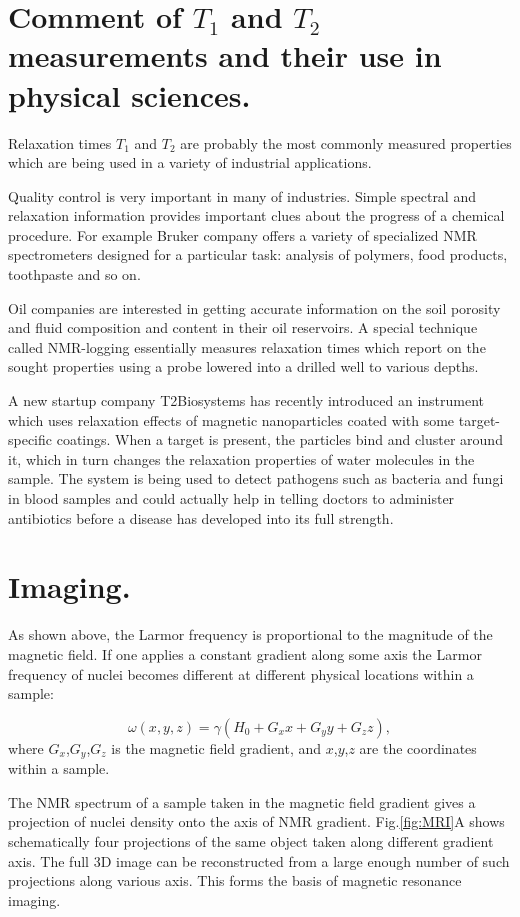\documentclass[a4paper, 12pt]{article}
\begin{document}
\section{Comment of $T_1$ and $T_2$ measurements and their use in physical sciences.}
  Relaxation times  $T_1$ and $T_2$ are probably the most commonly measured properties which are being used in a variety of industrial applications. 
  
  Quality control is very important in many of industries. Simple spectral and relaxation information provides important clues about the progress of a chemical procedure. For example Bruker company offers a variety of specialized NMR spectrometers designed for a particular task: analysis of polymers, food products, toothpaste and so on.
  
  Oil companies are  interested in getting accurate information on the soil porosity and fluid composition and content in their oil reservoirs. A special technique called NMR-logging essentially measures relaxation times which report on the sought properties using a probe lowered into a drilled well to various depths.
  
 A new startup company T2Biosystems has recently introduced an instrument which uses relaxation effects of magnetic nanoparticles coated with some target-specific coatings. When a target is present, the particles bind and cluster around it, which in turn changes the relaxation properties of water molecules in the sample. The system is being used to detect pathogens such as bacteria and fungi in blood samples and could actually help in telling doctors to administer antibiotics before a disease has developed into its full strength.
\section{Imaging.}

 As shown above, the Larmor frequency is proportional to the magnitude of the magnetic field. If one applies a constant gradient along some axis the Larmor frequency of nuclei becomes different at different physical locations within a sample:
 
\begin{equation}
\omega(x,y,z) = \gamma (H_0 + G_x x + G_y y + G_z z),
\end{equation}
where $G_x$,$G_y$,$G_z$ is the magnetic field gradient, and $x$,$y$,$z$ are the coordinates within a sample.

The NMR spectrum of a sample taken in the magnetic field gradient gives a projection of nuclei density onto the axis of NMR gradient. Fig.\ref{fig:MRI}A shows schematically four projections of the same object taken along different gradient axis. The full 3D image can be reconstructed from a large enough number of such projections along various axis. This forms the basis of magnetic resonance imaging. 
\end{document}
